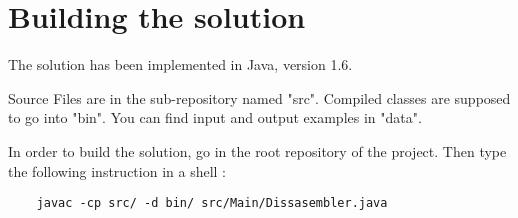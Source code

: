 \section{Building the solution}

The solution has been implemented in Java, version 1.6.

Source Files are in the sub-repository named "src". Compiled classes are supposed to go into "bin". You can find input and output examples in "data".

In order to build the solution, go in the root repository of the project. Then type the following instruction in a shell :
\begin{verbatim}
	javac -cp src/ -d bin/ src/Main/Dissasembler.java
\end{verbatim}

